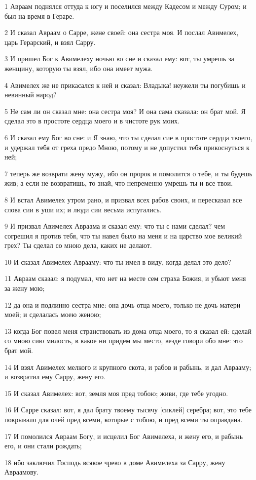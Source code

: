 \par 1 Авраам поднялся оттуда к югу и поселился между Кадесом и между Суром; и был на время в Гераре.
\par 2 И сказал Авраам о Сарре, жене своей: она сестра моя. И послал Авимелех, царь Герарский, и взял Сарру.
\par 3 И пришел Бог к Авимелеху ночью во сне и сказал ему: вот, ты умрешь за женщину, которую ты взял, ибо она имеет мужа.
\par 4 Авимелех же не прикасался к ней и сказал: Владыка! неужели ты погубишь и невинный народ?
\par 5 Не сам ли он сказал мне: она сестра моя? И она сама сказала: он брат мой. Я сделал это в простоте сердца моего и в чистоте рук моих.
\par 6 И сказал ему Бог во сне: и Я знаю, что ты сделал сие в простоте сердца твоего, и удержал тебя от греха предо Мною, потому и не допустил тебя прикоснуться к ней;
\par 7 теперь же возврати жену мужу, ибо он пророк и помолится о тебе, и ты будешь жив; а если не возвратишь, то знай, что непременно умрешь ты и все твои.
\par 8 И встал Авимелех утром рано, и призвал всех рабов своих, и пересказал все слова сии в уши их; и люди сии весьма испугались.
\par 9 И призвал Авимелех Авраама и сказал ему: что ты с нами сделал? чем согрешил я против тебя, что ты навел было на меня и на царство мое великий грех? Ты сделал со мною дела, каких не делают.
\par 10 И сказал Авимелех Аврааму: что ты имел в виду, когда делал это дело?
\par 11 Авраам сказал: я подумал, что нет на месте сем страха Божия, и убьют меня за жену мою;
\par 12 да она и подлинно сестра мне: она дочь отца моего, только не дочь матери моей; и сделалась моею женою;
\par 13 когда Бог повел меня странствовать из дома отца моего, то я сказал ей: сделай со мною сию милость, в какое ни придем мы место, везде говори обо мне: это брат мой.
\par 14 И взял Авимелех мелкого и крупного скота, и рабов и рабынь, и дал Аврааму; и возвратил ему Сарру, жену его.
\par 15 И сказал Авимелех: вот, земля моя пред тобою; живи, где тебе угодно.
\par 16 И Сарре сказал: вот, я дал брату твоему тысячу [сиклей] серебра; вот, это тебе покрывало для очей пред всеми, которые с тобою, и пред всеми ты оправдана.
\par 17 И помолился Авраам Богу, и исцелил Бог Авимелеха, и жену его, и рабынь его, и они стали рождать;
\par 18 ибо заключил Господь всякое чрево в доме Авимелеха за Сарру, жену Авраамову.

